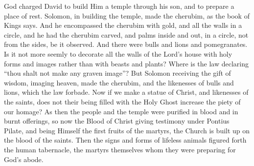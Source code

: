 \documentclass[10pt]{book}
\newcommand{\switchGreek}[1][]{\selectlanguage{polutonikogreek} \switchcolumn*[#1]}
\newcommand{\switchEnglish}{\selectlanguage{english} \switchcolumn}
\begin{document}
\begin{paracol}{2}
\switchEnglish

God charged David to build Him a temple 
through his son, and to prepare a place of rest. 
Solomon, in building the temple, made the 
cherubim, as the book of Kings says. And he 
encompassed the cherubim with gold, and all 
the walls in a circle, and he had the cherubim 
carved, and palms inside and out, in a circle, 
not from the sides, be it observed. And there 
were bulls and lions and pomegranates. Is it 
not more seemly to decorate all the walls of 
the Lord's house with holy forms and images 
rather than with beasts and plants? Where is 
the law declaring ``thou shalt not make any 
graven image''? But Solomon receiving the 
gift of wisdom, imaging heaven, made the 
cherubim, and the likenesses of bulls and lions, 
which the law forbade. Now if we make a 
statue of Christ, and likenesses of the saints, 
does not their being filled with the Holy Ghost 
increase the piety of our homage? As then 
the people and the temple were purified in 
blood and in burnt offerings, so now the Blood 
of Christ giving testimony under Pontius 
Pilate, and being Himself the first fruits of 
the martyrs, the Church is built up on the 
blood of the saints. Then the signs and 
forms of lifeless animals figured forth the 
human tabernacle, the martyrs themselves 
whom they were preparing for God's abode. 

\switchGreek


\end{paracol}
\end{document}
